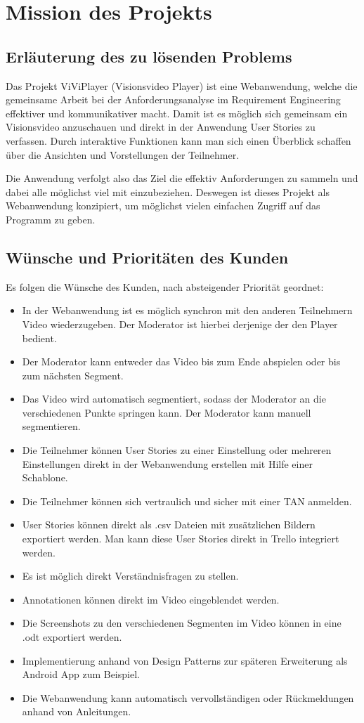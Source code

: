 \section{Mission des Projekts}

\subsection{Erläuterung des zu lösenden Problems}
Das Projekt ViViPlayer (Visionsvideo Player) ist eine Webanwendung, welche die gemeinsame Arbeit 
bei der Anforderungsanalyse im Requirement Engineering effektiver und kommunikativer macht.
Damit ist es möglich sich gemeinsam ein Visionsvideo anzuschauen und direkt in der Anwendung User Stories
zu verfassen. Durch interaktive Funktionen kann man sich einen Überblick schaffen über die Ansichten und Vorstellungen der Teilnehmer.

Die Anwendung verfolgt also das Ziel die effektiv Anforderungen zu sammeln und dabei alle möglichst viel mit einzubeziehen.
Deswegen ist dieses Projekt als Webanwendung konzipiert, um möglichst vielen einfachen Zugriff auf das Programm zu geben.

\subsection{Wünsche und Prioritäten des Kunden}
	Es folgen die Wünsche des Kunden, nach absteigender Priorität geordnet:
	\begin{itemize}
		\item In der Webanwendung ist es möglich synchron mit den anderen Teilnehmern Video wiederzugeben. Der Moderator ist hierbei derjenige der den Player bedient.
		\item Der Moderator kann entweder das Video bis zum Ende abspielen oder bis zum nächsten Segment.
		\item Das Video wird automatisch segmentiert, sodass der Moderator an die verschiedenen Punkte springen kann. Der Moderator kann manuell segmentieren.
		\item Die Teilnehmer können User Stories zu einer Einstellung oder mehreren Einstellungen direkt in der Webanwendung erstellen mit Hilfe einer Schablone.
		\item Die Teilnehmer können sich vertraulich und sicher mit einer TAN anmelden.
		\item User Stories können direkt als .csv Dateien mit zusätzlichen Bildern exportiert werden. Man kann diese User Stories direkt in Trello integriert werden.
		\item Es ist möglich direkt Verständnisfragen zu stellen.
		\item Annotationen können direkt im Video eingeblendet werden.
		\item Die Screenshots zu den verschiedenen Segmenten im Video können in eine .odt exportiert werden.
		\item Implementierung anhand von Design Patterns zur späteren Erweiterung als Android App zum Beispiel.
		\item Die Webanwendung kann automatisch vervollständigen oder Rückmeldungen anhand von Anleitungen.
	\end{itemize}

